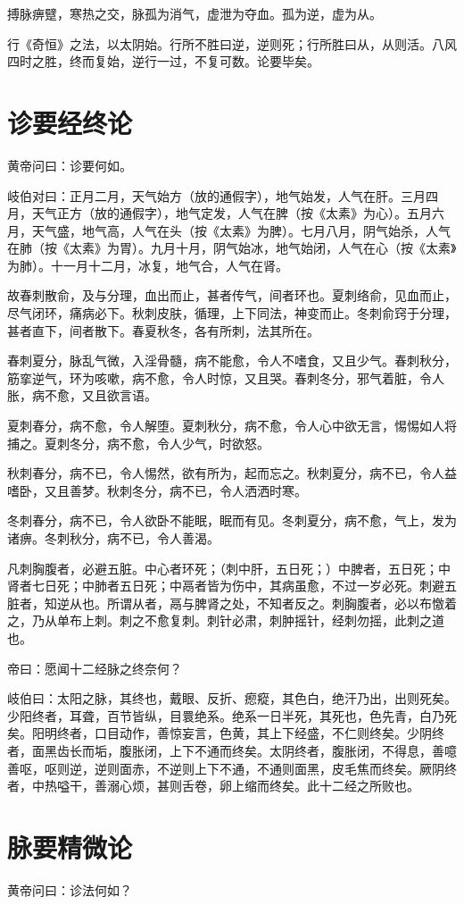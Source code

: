 \documentclass{article}%
\begin{document}
搏脉痹躄，寒热之交，脉孤为消气，虚泄为夺血。孤为逆，虚为从。

行《奇恒》之法，以太阴始。行所不胜曰逆，逆则死；行所胜曰从，从则活。八风四时之胜，终而复始，逆行一过，不复可数。论要毕矣。
\section{诊要经终论}
黄帝问曰：诊要何如。

岐伯对曰：正月二月，天气始方（放的通假字），地气始发，人气在肝。三月四月，天气正方（放的通假字），地气定发，人气在脾（按《太素》为心）。五月六月，天气盛，地气高，人气在头（按《太素》为脾）。七月八月，阴气始杀，人气在肺（按《太素》为胃）。九月十月，阴气始冰，地气始闭，人气在心（按《太素》为肺）。十一月十二月，冰复，地气合，人气在肾。

故春刺散俞，及与分理，血出而止，甚者传气，间者环也。夏刺络俞，见血而止，尽气闭环，痛病必下。秋刺皮肤，循理，上下同法，神变而止。冬刺俞窍于分理，甚者直下，间者散下。春夏秋冬，各有所刺，法其所在。

春刺夏分，脉乱气微，入淫骨髓，病不能愈，令人不嗜食，又且少气。春刺秋分，筋挛逆气，环为咳嗽，病不愈，令人时惊，又且哭。春刺冬分，邪气着脏，令人胀，病不愈，又且欲言语。

夏刺春分，病不愈，令人解堕。夏刺秋分，病不愈，令人心中欲无言，惕惕如人将捕之。夏刺冬分，病不愈，令人少气，时欲怒。

秋刺春分，病不已，令人惕然，欲有所为，起而忘之。秋刺夏分，病不已，令人益嗜卧，又且善梦。秋刺冬分，病不已，令人洒洒时寒。

冬刺春分，病不已，令人欲卧不能眠，眠而有见。冬刺夏分，病不愈，气上，发为诸痹。冬刺秋分，病不已，令人善渴。

凡刺胸腹者，必避五脏。中心者环死；（刺中肝，五日死；）中脾者，五日死；中肾者七日死；中肺者五日死；中鬲者皆为伤中，其病虽愈，不过一岁必死。刺避五脏者，知逆从也。所谓从者，鬲与脾肾之处，不知者反之。刺胸腹者，必以布憿着之，乃从单布上刺。刺之不愈复刺。刺针必肃，刺肿摇针，经刺勿摇，此刺之道也。

帝曰：愿闻十二经脉之终奈何？

岐伯曰：太阳之脉，其终也，戴眼、反折、瘛瘲，其色白，绝汗乃出，出则死矣。少阳终者，耳聋，百节皆纵，目睘绝系。绝系一日半死，其死也，色先青，白乃死矣。阳明终者，口目动作，善惊妄言，色黄，其上下经盛，不仁则终矣。少阴终者，面黑齿长而垢，腹胀闭，上下不通而终矣。太阴终者，腹胀闭，不得息，善噫善呕，呕则逆，逆则面赤，不逆则上下不通，不通则面黑，皮毛焦而终矣。厥阴终者，中热嗌干，善溺心烦，甚则舌卷，卵上缩而终矣。此十二经之所败也。
\section{脉要精微论}
黄帝问曰：诊法何如？
\end{document}
